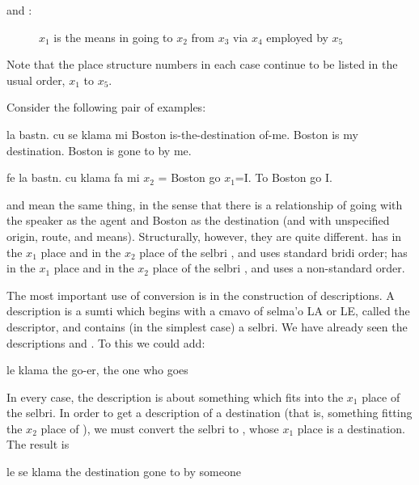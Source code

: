 and : 
\begin{description}
\item[] $x_1$ is the means in going to $x_2$ from $x_3$ via $x_4$ employed by $x_5$
\end{description}

Note that the place structure numbers in each case continue to
    be listed in the usual order, $x_1$ to $x_5$. 

Consider the following pair of examples:
\begin{example}
la bastn. cu se klama mi\n
Boston is-the-destination of-me.\n
Boston is my destination.\n
Boston is gone to by me.
\end{example}

\begin{example}
fe la bastn. cu klama fa mi\n
$x_2$ = Boston go $x_1$=I.\n
To Boston go I.
\end{example}

 and  mean the same thing, in the sense that there is a
    relationship of going with the speaker as the agent and Boston
    as the destination (and with unspecified origin, route, and
    means). Structurally, however, they are quite different.  has  in the $x_1$ place
    and  in the $x_2$ place of the selbri , and uses
    standard bridi order;  has
     in the $x_1$ place and  in the $x_2$ place of the
    selbri , and uses a non-standard order. 

The most important use of conversion is in the construction
    of descriptions. A description is a sumti which begins with a
    cmavo of selma'o LA or LE, called the descriptor, and contains
    (in the simplest case) a selbri. We have already seen the
    descriptions  and . To this we could
    add:
\begin{example}
le klama\n
the go-er, the one who goes
\end{example}

In every case, the description is about something which fits
    into the $x_1$ place of the selbri. In order to get a description
    of a destination (that is, something fitting the $x_2$ place of
    ), we must convert the selbri to , whose
    $x_1$ place is a destination. The result is
\begin{example}
le se klama\n
the destination gone to by someone
\end{example}

